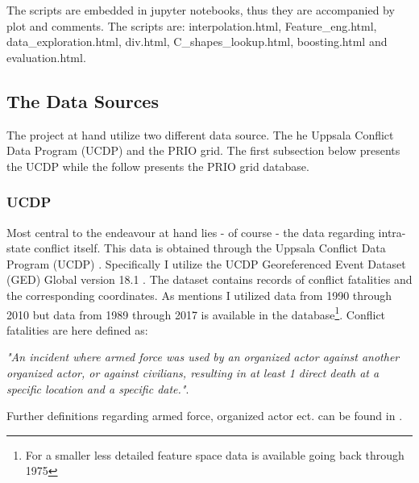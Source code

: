\documentclass[a4paper]{article}
\begin{document}
The scripts are embedded in jupyter notebooks, thus they are accompanied by plot and comments. The scripts are: interpolation.html, Feature\_eng.html, data\_exploration.html, div.html, C\_shapes\_lookup.html, boosting.html and evaluation.html.\par

\subsection{The Data Sources}\label{data_sources} %

The project at hand utilize two different data source. The he Uppsala Conflict Data Program (UCDP) \citep{Sundberg_2013, Croicu_Sundberg_2017} and the PRIO grid\citep{Tollefsen_2012}. The first subsection below presents the UCDP while the follow presents the PRIO grid database.\par

\subsubsection{UCDP}

Most central to the endeavour at hand lies - of course - the data regarding intra-state conflict itself. This data is obtained through the Uppsala Conflict Data Program (UCDP) \citep{Sundberg_2013, Croicu_Sundberg_2017}. Specifically I utilize the UCDP Georeferenced Event Dataset (GED) Global version 18.1 \citep{UCDP_2017}. The dataset contains records of conflict fatalities and the corresponding coordinates. As mentions I utilized data from 1990 through 2010 but data from 1989 through 2017 is available in the database\footnote{For a smaller less detailed feature space data is available going back through 1975}. Conflict fatalities are here defined as: 

\begin{displayquote}

\emph{"An incident where armed force was used by an organized actor against another organized actor, or against civilians, resulting in at least 1 direct death at a specific location and a specific date."}\citep[38]{Croicu_Sundberg_2017}.

\end{displayquote}

Further definitions regarding armed force, organized actor ect. can be found in \cite[10-11]{Croicu_Sundberg_2017}.\par 
\end{document}

